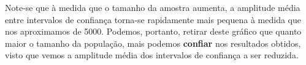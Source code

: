 \documentclass[11pt]{article}
\begin{document}

Note-se que à medida que o tamanho da amostra aumenta, a amplitude média entre intervalos
de confiança torna-se rapidamente mais pequena à medida que nos aproximamos de 5000.
Podemos, portanto, retirar deste gráfico que quanto maior o tamanho da população, mais
podemos \textbf{confiar} nos resultados obtidos, visto que vemos a amplitude média
dos intervalos de confiança a ser reduzida.
\end{document}
